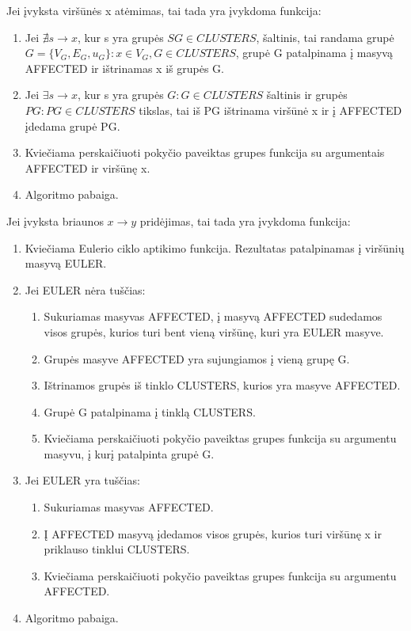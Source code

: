 Jei įvyksta viršūnės x atėmimas, tai tada yra įvykdoma funkcija:
\begin{enumerate}
\item Jei $\nexists s \rightarrow x$, kur s yra grupės $SG \in CLUSTERS$, šaltinis, tai randama grupė $G=\{V_G, E_G, u_G\} : x \in V_G, G \in CLUSTERS$, grupė G patalpinama į masyvą AFFECTED ir ištrinamas x iš grupės G.
\item Jei $\exists s \rightarrow x$, kur s yra grupės $G : G \in CLUSTERS$ šaltinis ir grupės $PG : PG \in CLUSTERS$ tikslas, tai iš PG ištrinama viršūnė x ir į AFFECTED įdedama grupė PG.
\item Kviečiama perskaičiuoti pokyčio paveiktas grupes funkcija su argumentais AFFECTED ir viršūnę x.
\item Algoritmo pabaiga. 
\end{enumerate}

Jei įvyksta briaunos $x \rightarrow y$ pridėjimas, tai tada yra įvykdoma funkcija:
\begin{enumerate}
	\item Kviečiama Eulerio ciklo aptikimo funkcija. Rezultatas patalpinamas į viršūnių masyvą EULER.
	\item Jei EULER nėra tuščias:
		\begin{enumerate}
			\item Sukuriamas masyvas AFFECTED, į masyvą AFFECTED sudedamos visos grupės, kurios turi bent vieną viršūnę, kuri yra EULER masyve.
			\item Grupės masyve AFFECTED yra sujungiamos į vieną grupę G.
			\item Ištrinamos grupės iš tinklo CLUSTERS, kurios yra masyve AFFECTED.
			\item Grupė G patalpinama į tinklą CLUSTERS.
			\item Kviečiama perskaičiuoti pokyčio paveiktas grupes funkcija su argumentu masyvu, į kurį patalpinta grupė G.
		\end{enumerate} 
	\item Jei EULER yra tuščias:
		\begin{enumerate}
			\item Sukuriamas masyvas AFFECTED.
			\item Į AFFECTED masyvą įdedamos visos grupės, kurios turi viršūnę x ir priklauso tinklui CLUSTERS.
			\item Kviečiama perskaičiuoti pokyčio paveiktas grupes funkcija su argumentu AFFECTED.
		\end{enumerate} 
	\item Algoritmo pabaiga. 
\end{enumerate}

